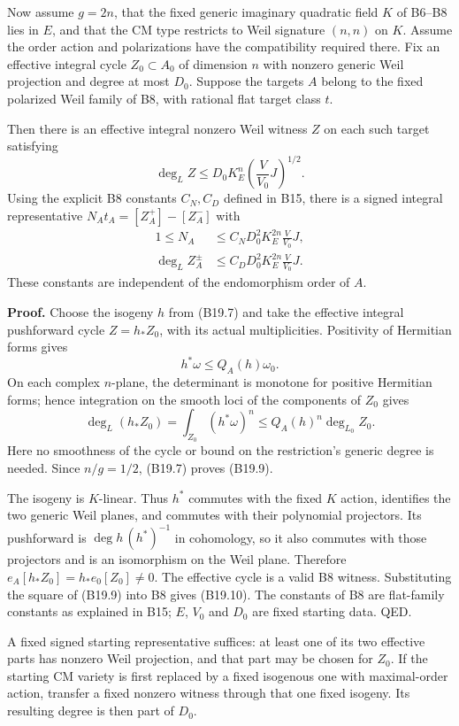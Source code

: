 \documentclass[11pt,a4paper]{article}
\theoremstyle{definition}
\begin{document}
Now assume \(g=2n\), that the fixed generic imaginary quadratic field \(K\) of B6--B8 lies in \(E\), and that the CM type restricts to Weil signature \((n,n)\) on \(K\). Assume the order action and polarizations have the compatibility required there. Fix an effective integral cycle \(Z_0\subset A_0\) of dimension \(n\) with nonzero generic Weil projection and degree at most \(D_0\). Suppose the targets \(A\) belong to the fixed polarized Weil family of B8, with rational flat target class \(t\).

Then there is an effective integral nonzero Weil witness \(Z\) on each such target satisfying \[
 \deg_L Z
 \le D_0 K_E^n\left(\frac{V}{V_0}J\right)^{1/2}.
\tag{B19.9}
\] Using the explicit B8 constants \(C_N,C_D\) defined in B15, there is a signed integral representative \(N_A t_A=[Z_A^+]-[Z_A^-]\) with \[
 \begin{aligned}
 1\le N_A&\le C_N D_0^2 K_E^{2n}\frac{V}{V_0}J,\\
 \deg_L Z_A^\pm&\le C_D D_0^2 K_E^{2n}\frac{V}{V_0}J.
 \end{aligned}
\tag{B19.10}
\] These constants are independent of the endomorphism order of \(A\).

\textbf{Proof.} Choose the isogeny \(h\) from (B19.7) and take the effective integral pushforward cycle \(Z=h_*Z_0\), with its actual multiplicities. Positivity of Hermitian forms gives \[
 h^*\omega\le Q_A(h)\omega_0.
\] On each complex \(n\)-plane, the determinant is monotone for positive Hermitian forms; hence integration on the smooth loci of the components of \(Z_0\) gives \[
 \deg_L(h_*Z_0)
 =\int_{Z_0}(h^*\omega)^n
 \le Q_A(h)^n\deg_{L_0}Z_0.
\tag{B19.11}
\] Here no smoothness of the cycle or bound on the restriction's generic degree is needed. Since \(n/g=1/2\), (B19.7) proves (B19.9).

The isogeny is \(K\)-linear. Thus \(h^*\) commutes with the fixed \(K\) action, identifies the two generic Weil planes, and commutes with their polynomial projectors. Its pushforward is \(\deg h\,(h^*)^{-1}\) in cohomology, so it also commutes with those projectors and is an isomorphism on the Weil plane. Therefore \(e_A[h_*Z_0]=h_*e_0[Z_0]\ne0\). The effective cycle is a valid B8 witness. Substituting the square of (B19.9) into B8 gives (B19.10). The constants of B8 are flat-family constants as explained in B15; \(E\), \(V_0\) and \(D_0\) are fixed starting data. QED.

A fixed signed starting representative suffices: at least one of its two effective parts has nonzero Weil projection, and that part may be chosen for \(Z_0\). If the starting CM variety is first replaced by a fixed isogenous one with maximal-order action, transfer a fixed nonzero witness through that one fixed isogeny. Its resulting degree is then part of \(D_0\).
\end{document}
